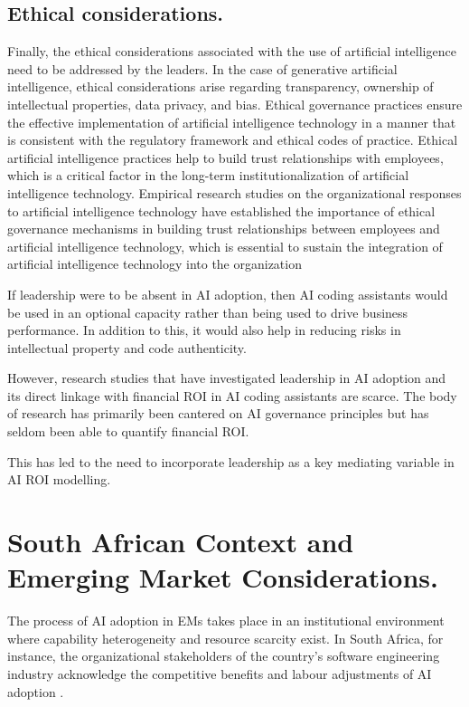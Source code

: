 \subsection {Ethical considerations.}
\label{sec:Ethical considerations}
Finally, the ethical considerations associated with the use of artificial intelligence need to be addressed by the leaders. In the case of generative artificial intelligence, ethical considerations arise regarding transparency, ownership of intellectual properties, data privacy, and bias. Ethical governance practices ensure the effective implementation of artificial intelligence technology in a manner that is consistent with the regulatory framework and ethical codes of practice. Ethical artificial intelligence practices help to build trust relationships with employees, which is a critical factor in the long-term institutionalization of artificial intelligence technology. Empirical research studies on the organizational responses to artificial intelligence technology have established the importance of ethical governance mechanisms in building trust relationships between employees and artificial intelligence technology, which is essential to sustain the integration of artificial intelligence technology into the organization \autocite{Daly2025}

If leadership were to be absent in AI adoption, then AI coding assistants would be used in an optional capacity rather than being used to drive business performance. In addition to this, it would also help in reducing risks in intellectual property and code authenticity.

However, research studies that have investigated leadership in AI adoption and its direct linkage with financial ROI in AI coding assistants are scarce. The body of research has primarily been cantered on AI governance principles but has seldom been able to quantify financial ROI.

This has led to the need to incorporate leadership as a key mediating variable in AI ROI modelling.

\section {South African Context and Emerging Market Considerations.}
\label{sec:South African Context and Emerging Market Considerations}
The process of AI adoption in EMs takes place in an institutional environment where capability heterogeneity and resource scarcity exist. In South Africa, for instance, the organizational stakeholders of the country's software engineering industry acknowledge the competitive benefits and labour adjustments of AI adoption \autocite{Poisat2024}.

